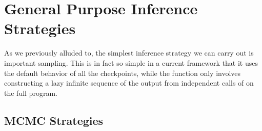 
\section{General Purpose Inference Strategies}
\label{sec:proginf:str}


As we previously alluded to, the simplest inference strategy we can carry out is important
sampling.  This is in fact so simple in a current framework that it uses the default behavior
of all the checkpoints, while the \anginfer function only involves constructing a lazy infinite
sequence of the output from independent calls of  on the full program.

\subsection{MCMC Strategies}
\label{sec:proginf:str:lmh}

